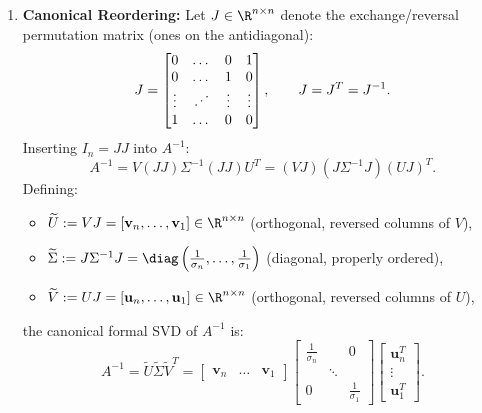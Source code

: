 \begin{example}
\begin{enumerate}
    \item \textbf{Canonical Reordering:}
    Let $J \in \R^{n \times n}$ denote the exchange/reversal permutation matrix (ones on the antidiagonal):
    \begin{equation}
        J = \begin{bmatrix}
            0 & \dots & 0 & 1 \\
            0 & \dots & 1 & 0 \\
            \vdots & \mathinner{\mkern1mu\raise1pt\vbox{\kern7pt\hbox{.}}\mkern2mu\raise4pt\hbox{.}\mkern2mu\raise7pt\hbox{.}\mkern1mu} & \vdots & \vdots \\
            1 & \dots & 0 & 0
        \end{bmatrix}, \qquad J = J^T = J^{-1}.
    \end{equation}
    Inserting $I_n = J J$ into $A^{-1}$:
    \begin{equation}
        A^{-1} = V (J J) \Sigma^{-1} (J J) U^T = (V J) (J \Sigma^{-1} J) (U J)^T.
    \end{equation}
    Defining:
    \begin{itemize}
        \item $\widetilde{U} := V J = [\mathbf{v}_n, \dots, \mathbf{v}_1] \in \R^{n \times n}$ (orthogonal, reversed columns of $V$),
            \item $\widetilde{\Sigma} := J \Sigma^{-1} J = \diag\left(\frac{1}{\sigma_n}, \dots, \frac{1}{\sigma_1}\right)$ (diagonal, properly ordered),
            \item $\widetilde{V} := U J = [\mathbf{u}_n, \dots, \mathbf{u}_1] \in \R^{n \times n}$ (orthogonal, reversed columns of $U$),
    \end{itemize}
    the canonical formal SVD of $A^{-1}$ is:
    \begin{equation}
        A^{-1} = \widetilde{U} \widetilde{\Sigma} \widetilde{V}^T = \begin{bmatrix} \mathbf{v}_n & \dots & \mathbf{v}_1 \end{bmatrix} \begin{bmatrix} \frac{1}{\sigma_n} & & 0 \\ & \ddots & \\ 0 & & \frac{1}{\sigma_1} \end{bmatrix} \begin{bmatrix} \mathbf{u}_n^T \\ \vdots \\ \mathbf{u}_1^T \end{bmatrix}.
    \end{equation}
\end{enumerate}
\end{example}

